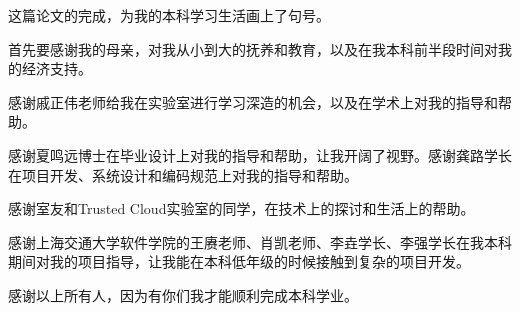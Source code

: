 \begin{thanks}

这篇论文的完成，为我的本科学习生活画上了句号。

首先要感谢我的母亲，对我从小到大的抚养和教育，以及在我本科前半段时间对我的经济支持。

感谢戚正伟老师给我在实验室进行学习深造的机会，以及在学术上对我的指导和帮助。

感谢夏鸣远博士在毕业设计上对我的指导和帮助，让我开阔了视野。感谢龚路学长在项目开发、系统设计和编码规范上对我的指导和帮助。

感谢室友和Trusted Cloud实验室的同学，在技术上的探讨和生活上的帮助。

感谢上海交通大学软件学院的王赓老师、肖凯老师、李垚学长、李强学长在我本科期间对我的项目指导，让我能在本科低年级的时候接触到复杂的项目开发。

感谢以上所有人，因为有你们我才能顺利完成本科学业。

\end{thanks}

